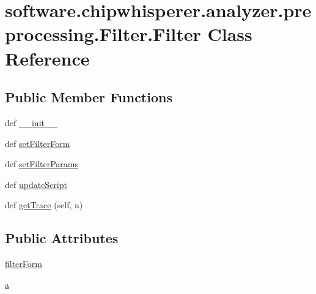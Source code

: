 \hypertarget{classsoftware_1_1chipwhisperer_1_1analyzer_1_1preprocessing_1_1Filter_1_1Filter}{}\section{software.\+chipwhisperer.\+analyzer.\+preprocessing.\+Filter.\+Filter Class Reference}
\label{classsoftware_1_1chipwhisperer_1_1analyzer_1_1preprocessing_1_1Filter_1_1Filter}
\subsection*{Public Member Functions}
\begin{DoxyCompactItemize}
\item 
def \hyperlink{classsoftware_1_1chipwhisperer_1_1analyzer_1_1preprocessing_1_1Filter_1_1Filter_a335acd9a849fe173db62647a4dc969a0}{\+\_\+\+\_\+init\+\_\+\+\_\+}
\item 
def \hyperlink{classsoftware_1_1chipwhisperer_1_1analyzer_1_1preprocessing_1_1Filter_1_1Filter_ae3847a7ad9072842c745159d67cbcc5a}{set\+Filter\+Form}
\item 
def \hyperlink{classsoftware_1_1chipwhisperer_1_1analyzer_1_1preprocessing_1_1Filter_1_1Filter_a8007d36b5f54cfcc028c1c65ef328194}{set\+Filter\+Params}
\item 
def \hyperlink{classsoftware_1_1chipwhisperer_1_1analyzer_1_1preprocessing_1_1Filter_1_1Filter_a5fdea1c276893719ac8026b08391a765}{update\+Script}
\item 
def \hyperlink{classsoftware_1_1chipwhisperer_1_1analyzer_1_1preprocessing_1_1Filter_1_1Filter_ad7e1be9f62f42b036b5a29846aee35ba}{get\+Trace} (self, n)
\end{DoxyCompactItemize}
\subsection*{Public Attributes}
\begin{DoxyCompactItemize}
\item 
\hyperlink{classsoftware_1_1chipwhisperer_1_1analyzer_1_1preprocessing_1_1Filter_1_1Filter_a753b5278c41e90755bb358f6f857fd83}{filter\+Form}
\item 
\hyperlink{classsoftware_1_1chipwhisperer_1_1analyzer_1_1preprocessing_1_1Filter_1_1Filter_a7c21ef1b9bd67b76c3d87c3a85be57e4}{a}
\end{DoxyCompactItemize}


